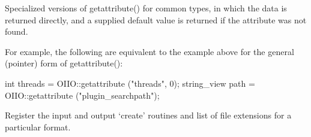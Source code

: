  
Specialized versions of {\cf getattribute()} for common types, in which the
data is returned directly, and a supplied default value is returned if the
attribute was not found.

For example, the following are equivalent to the example above for the
general (pointer) form of {\cf getattribute()}:

\begin{code}
      int threads = OIIO::getattribute ("threads", 0);
      string_view path = OIIO::getattribute ("plugin_searchpath");
\end{code}
\apiend


Register the input and output `create' routines and list of file
extensions for a particular format.
\apiend



\chapwidthend
